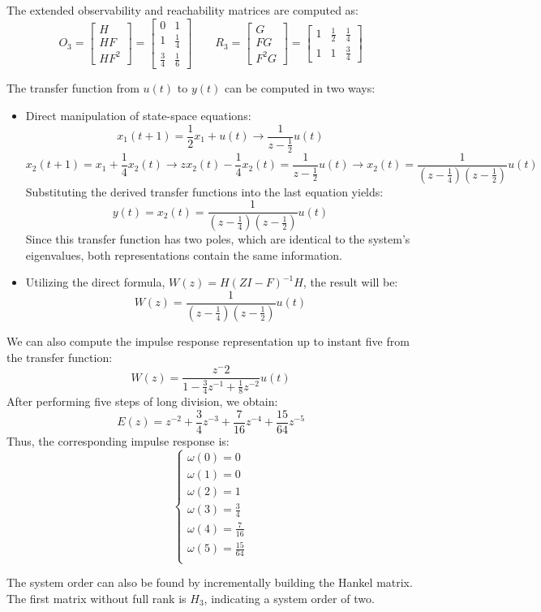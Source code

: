 \begin{example}
    The extended observability and reachability matrices are computed as:
    \[O_3=\begin{bmatrix} H \\ HF \\ HF^2 \end{bmatrix}=\begin{bmatrix} 0 & 1 \\ 1 & \frac{1}{4} \\ \frac{3}{4} & \frac{1}{6} \end{bmatrix} \qquad R_3=\begin{bmatrix} G \\ FG \\ F^2G \end{bmatrix}=\begin{bmatrix} 1 & \frac{1}{2} & \frac{1}{4} \\ 1 & 1 & \frac{3}{4} \end{bmatrix}\]

    The transfer function from $u(t)$ to $y(t)$ can be computed in two ways:
    \begin{itemize}
        \item Direct manipulation of state-space equations:
            \[x_1(t+1)=\frac{1}{2}x_1+u(t)\rightarrow \dfrac{1}{z-\frac{1}{2}}u(t)\]
            \[x_2(t+1)=x_1+\frac{1}{4}x_2(t)\rightarrow zx_2(t)-\frac{1}{4}x_2(t)=\dfrac{1}{z-\frac{1}{2}}u(t)\rightarrow x_2(t)=\dfrac{1}{\left(z-\frac{1}{4}\right)\left(z-\frac{1}{2}\right)}u(t)\]
            Substituting the derived transfer functions into the last equation yields:
            \[y(t)=x_2(t)=\dfrac{1}{\left(z-\frac{1}{4}\right)\left(z-\frac{1}{2}\right)}u(t)\]
            Since this transfer function has two poles, which are identical to the system's eigenvalues, both representations contain the same information.
        \item Utilizing the direct formula, $W(z)=H\left(ZI-F\right)^{-1}H$, the result will be:
            \[W(z)=\dfrac{1}{\left(z-\frac{1}{4}\right)\left(z-\frac{1}{2}\right)}u(t)\]
    \end{itemize}

    We can also compute the impulse response representation up to instant five from the transfer function:
    \[W(z)=\dfrac{z^-2}{1-\frac{3}{4}z^{-1}+\frac{1}{8}z^{-2}}u(t)\]
    After performing five steps of long division, we obtain:
    \[E(z)=z^{-2}+\dfrac{3}{4}z^{-3}+\dfrac{7}{16}z^{-4}+\dfrac{15}{64}z^{-5}\]
    Thus, the corresponding impulse response is:
    \[\begin{cases}
        \omega(0)=0 \\
        \omega(1)=0 \\
        \omega(2)=1 \\
        \omega(3)=\frac{3}{4} \\
        \omega(4)=\frac{7}{16} \\
        \omega(5)=\frac{15}{64} \\
    \end{cases}\]

    The system order can also be found by incrementally building the Hankel matrix.
    The first matrix without full rank is $H_3$, indicating a system order of two.
\end{example}